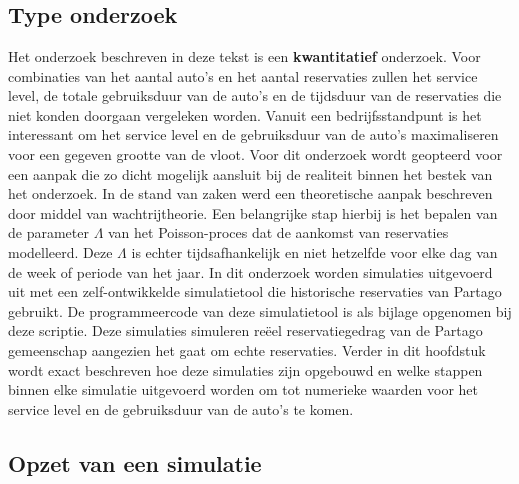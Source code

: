 
\chapter{}
\label{ch:methodologie}

\section{Type onderzoek}
Het onderzoek beschreven in deze tekst is een \textbf{kwantitatief} onderzoek. Voor combinaties van het aantal auto's en het aantal reservaties zullen het service level, de totale gebruiksduur van de auto's en de tijdsduur van de reservaties die niet konden doorgaan vergeleken worden. Vanuit een bedrijfsstandpunt is het interessant om het service level en de gebruiksduur van de auto's maximaliseren voor een gegeven grootte van de vloot. Voor dit onderzoek wordt geopteerd voor een aanpak die zo dicht mogelijk aansluit bij de realiteit binnen het bestek van het onderzoek. In de stand van zaken werd een theoretische aanpak beschreven door middel van wachtrijtheorie. Een belangrijke stap hierbij is het bepalen van de parameter $\Lambda$ van het Poisson-proces dat de aankomst van reservaties modelleerd. Deze $\Lambda$ is echter tijdsafhankelijk en niet hetzelfde voor elke dag van de week of periode van het jaar. In dit onderzoek worden simulaties uitgevoerd uit met een zelf-ontwikkelde simulatietool die historische reservaties van Partago gebruikt. De programmeercode van deze simulatietool is als bijlage opgenomen bij deze scriptie. Deze simulaties simuleren reëel reservatiegedrag van de Partago gemeenschap aangezien het gaat om echte reservaties. Verder in dit hoofdstuk wordt exact beschreven hoe deze simulaties zijn opgebouwd en welke stappen binnen elke simulatie uitgevoerd worden om tot numerieke waarden voor het service level en de gebruiksduur van de auto's te komen. 

\section{Opzet van een simulatie}
